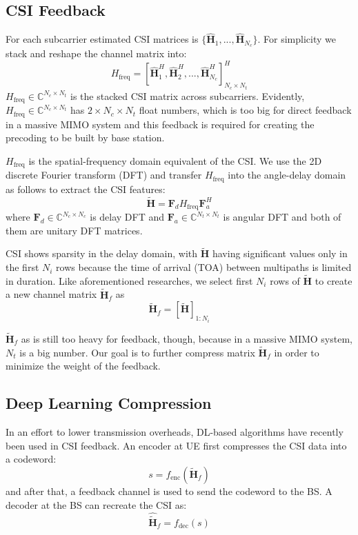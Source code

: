 \documentclass[lettersize,journal]{IEEEtran}
\begin{document}
\subsection{CSI Feedback}
For each subcarrier estimated CSI matrices is $\{ \hat{\mathbf{H}}_{1},...,\hat{\mathbf{H}}_{N_{c}} \}$. For simplicity we stack and reshape the channel matrix into:
\[
H_{\text{freq}}=\left[\hat{\mathbf{H}}_{1}^{H},\hat{\mathbf{H}}_{2}^{H},...,\hat{\mathbf{H}}_{N_{c}}^{H}\right]^{H}_{N_{c}\times N_{t}}
\]
$H_{\text{freq}} \in \mathbb{C}^{N_c \times N_t}$ is the stacked CSI matrix across subcarriers. Evidently, $H_{\text{freq}} \in \mathbb{C}^{N_{c}\times N_{t}}$ has $2\times N_{c}\times N_{t}$ float numbers, which is too big for direct feedback in a massive MIMO system and this feedback is required for creating the precoding to be built by base station.

$H_{\text{freq}}$ is the spatial-frequency domain equivalent of the CSI. We use the 2D discrete Fourier transform (DFT) and transfer $H_{\text{freq}}$ into the angle-delay domain as follows to extract the CSI features:
\[
\tilde{\mathbf{H}} = \mathbf{F}_d H_{\text{freq}} \mathbf{F}_a^H
\]
where $\mathbf{F}_d \in \mathbb{C}^{N_{c}\times N_{c}}$ is delay DFT and $\mathbf{F}_a \in \mathbb{C}^{N_{t}\times N_{t}}$ is angular DFT and both of them are unitary DFT matrices.

CSI shows sparsity in the delay domain, with $\tilde{\mathbf{H}}$ having significant values only in the first $N_{i}$ rows because the time of arrival (TOA) between multipaths is limited in duration. Like aforementioned researches, we select first $N_{i}$ rows of $\tilde{\mathbf{H}}$ to create a new channel matrix $\tilde{\mathbf{H}}_f$ as
\[
\tilde{\mathbf{H}}_f = \left[ \tilde{\mathbf{H}} \right]_{1:N_{i}} 
\]

$\tilde{\mathbf{H}}_f$ as is still too heavy for feedback, though, because in a massive MIMO system, $N_{t}$ is a big number. Our goal is to further compress matrix $\tilde{\mathbf{H}}_f$ in order to minimize the weight of the feedback.

\subsection{Deep Learning Compression}
In an effort to lower transmission overheads, DL-based algorithms have recently been used in CSI feedback. An encoder at UE first compresses the CSI data into a codeword:
\[
s = f_{\text{enc}}(\tilde{\mathbf{H}}_f) 
\]
and after that, a feedback channel is used to send the codeword to the BS. A decoder at the BS can recreate the CSI as:
\[
\hat{\tilde{\mathbf{H}}}_f = f_{\text{dec}}(s) 
\]
\end{document}
